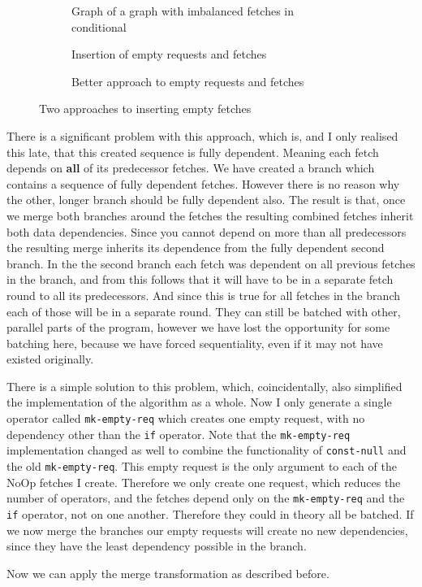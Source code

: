 \begin{figure}[h]
  \begin{subfigure}{\textwidth}
      \caption{Graph of a graph with imbalanced fetches in conditional}
      \label{fig:if-insert-empty-parallel-before}
  \end{subfigure}
  \begin{subfigure}[b]{0.5\textwidth}
      \caption{Insertion of empty requests and fetches}
      \label{fig:if-insert-empty-parallel-after}
  \end{subfigure}
  \begin{subfigure}[b]{.5\textwidth}
      \caption{Better approach to empty requests and fetches}
      \label{if-insert-empty-better-after-insert}
  \end{subfigure}
  \caption{Two approaches to inserting empty fetches}
\end{figure}


There is a significant problem with this approach, which is, and I only realised this late, that this created sequence is fully dependent.
Meaning each fetch depends on \textbf{all} of its predecessor fetches.
We have created a branch which contains a sequence of fully dependent fetches.
However there is no reason why the other, longer branch should be fully dependent also.
The result is that, once we merge both branches around the fetches the resulting combined fetches inherit both data dependencies.
Since you cannot depend on more than all predecessors the resulting merge inherits its dependence from the fully dependent second branch.
In the the second branch each fetch was dependent on all previous fetches in the branch, and from this follows that it will have to be in a separate fetch round to all its predecessors.
And since this is true for all fetches in the branch each of those will be in a separate round.
They can still be batched with other, parallel parts of the program, however we have lost the opportunity for some batching here, because we have forced sequentiality, even if it may not have existed originally.

There is a simple solution to this problem, which, coincidentally, also simplified the implementation of the algorithm as a whole.
Now I only generate a single operator called \texttt{mk-empty-req} which creates one empty request, with no dependency other than the \texttt{if} operator.
Note that the \texttt{mk-empty-req} implementation changed as well to combine the functionality of \texttt{const-null} and the old \texttt{mk-empty-req}.
This empty request is the only argument to each of the NoOp fetches I create.
Therefore we only create one request, which reduces the number of operators, and the fetches depend only on the \texttt{mk-empty-req} and the \texttt{if} operator, not on one another.
Therefore they could in theory all be batched.
If we now merge the branches our empty requests will create no new dependencies, since they have the least dependency possible in the branch.



Now we can apply the merge transformation as described before.
